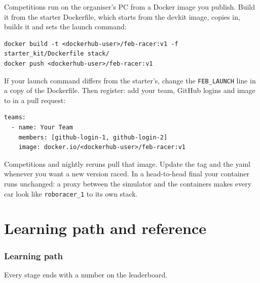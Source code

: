 \documentclass[11pt,a4paper]{article}
\begin{document}
Competitions run on the organiser's PC from a Docker image you publish. Build it from the
starter Dockerfile, which starts from the devkit image, copies  in, builds it and
sets the launch command:

\begin{lstlisting}
docker build -t <dockerhub-user>/feb-racer:v1 -f starter_kit/Dockerfile stack/
docker push <dockerhub-user>/feb-racer:v1
\end{lstlisting}

If your launch command differs from the starter's, change the \texttt{FEB\_LAUNCH} line in a
copy of the Dockerfile. Then register: add your team, GitHub logins and image to
 in a pull request:

\begin{lstlisting}
teams:
  - name: Your Team
    members: [github-login-1, github-login-2]
    image: docker.io/<dockerhub-user>/feb-racer:v1
\end{lstlisting}

Competitions and nightly reruns pull that image. Update the tag and the yaml whenever you
want a new version raced. In a head-to-head final your container runs unchanged: a proxy
between the simulator and the containers makes every car look like \texttt{roboracer\_1} to
its own stack.

\part{Learning path and reference}

\section{Learning path}

Every stage ends with a number on the leaderboard.
\end{document}
